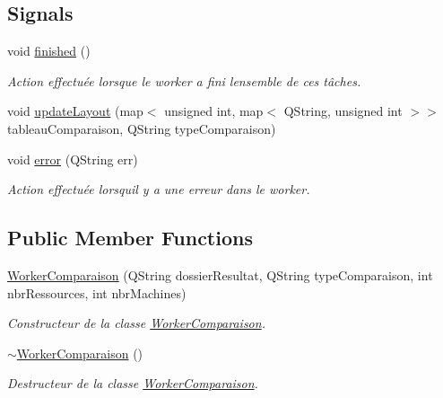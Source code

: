 \subsection*{Signals}
\begin{DoxyCompactItemize}
\item 
void \hyperlink{classWorkerComparaison_a22ed9afba5f29d89a014b2b895d995b2}{finished} ()
\begin{DoxyCompactList}\small\item\em Action effectuée lorsque le worker a fini l\textquotesingle{}ensemble de ces tâches. \end{DoxyCompactList}\item 
void \hyperlink{classWorkerComparaison_afc5278dea0a1d826ece10555812266bd}{update\+Layout} (map$<$ unsigned int, map$<$ Q\+String, unsigned int $>$$>$ tableau\+Comparaison, Q\+String type\+Comparaison)
\item 
void \hyperlink{classWorkerComparaison_aa9c167d230b850568f48575bc19241d7}{error} (Q\+String err)
\begin{DoxyCompactList}\small\item\em Action effectuée lorsqu\textquotesingle{}il y a une erreur dans le worker. \end{DoxyCompactList}\end{DoxyCompactItemize}
\subsection*{Public Member Functions}
\begin{DoxyCompactItemize}
\item 
\hyperlink{classWorkerComparaison_a145d174d34098a5271b223025f165b09}{Worker\+Comparaison} (Q\+String dossier\+Resultat, Q\+String type\+Comparaison, int nbr\+Ressources, int nbr\+Machines)
\begin{DoxyCompactList}\small\item\em Constructeur de la classe \hyperlink{classWorkerComparaison}{Worker\+Comparaison}. \end{DoxyCompactList}\item 
\hyperlink{classWorkerComparaison_a82acf722e3274431c0f86093c9dcb799}{$\sim$\+Worker\+Comparaison} ()
\begin{DoxyCompactList}\small\item\em Destructeur de la classe \hyperlink{classWorkerComparaison}{Worker\+Comparaison}. \end{DoxyCompactList}\end{DoxyCompactItemize}


